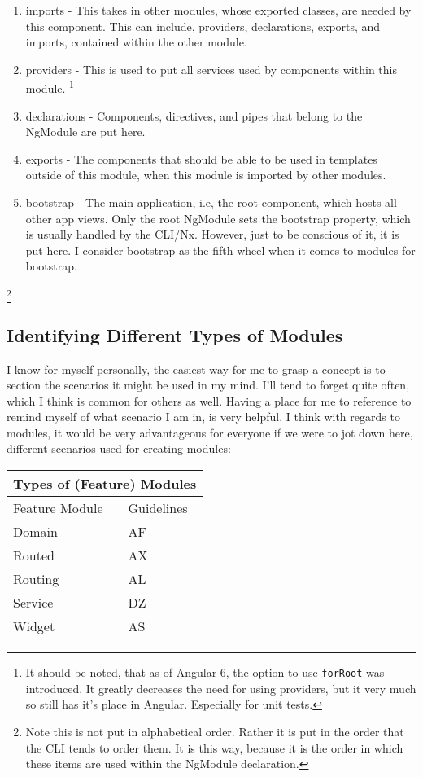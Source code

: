 \begin{enumerate}
  \item imports - This takes in other modules, whose exported classes, are
  needed by this component. This can include, providers, declarations, exports,
  and imports, contained within the other module.
  \item providers - This is used to put all services used by components within
  this module. \footnote{It should be noted, that as of Angular 6, the option
  to use \lstinline{forRoot} was introduced. It greatly decreases the need for
  using providers, but it very much so still has it's place in Angular.
  Especially for unit tests.}
  \item declarations - Components, directives, and pipes that belong to the
  NgModule are put here.
  \item exports - The components that should be able to be used in templates
  outside of this module, when this module is imported by other modules.
  \item bootstrap - The main application, i.e, the root component, which hosts
  all other app views. Only the root NgModule sets the bootstrap property,
  which is usually handled by the CLI/Nx. However, just to be conscious of it,
  it is put here. I consider bootstrap as the fifth wheel when it comes to
  modules for bootstrap.
\end{enumerate}
\footnote{Note this is not put in alphabetical order. Rather it is put in the
order that the CLI tends to order them. It is this way, because it is the order
in which these items are used within the NgModule declaration.}

\subsection{Identifying Different Types of Modules}
I know for myself personally, the easiest way for me to grasp a concept is to
section the scenarios it might be used in my mind. I'll tend to forget quite
often, which I think is common for others as well. Having a place for me to
reference to remind myself of what scenario I am in, is very helpful. I think
with regards to modules, it would be very advantageous for everyone if we were
to jot down here, different scenarios used for creating modules:

\begin{tabular}{ |p{3cm}||p{9cm}| }
 \hline
 \multicolumn{2}{|c|}{ Types of (Feature) Modules } \\
 \hline
 Feature Module & Guidelines\\
 \hline
 Domain& AF\\
 Routed& AX\\
 Routing& AL\\
 Service& DZ\\
 Widget& AS\\
 \hline
\end{tabular}

